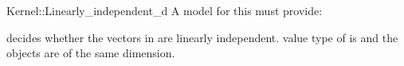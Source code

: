 \begin{ccRefFunctionObjectConcept}{Kernel::Linearly_independent_d}
A model for this must provide:


{decides whether the vectors in \ccc{A = tuple [first,last)} are linearly
 independent.  \ccPrecond value type of  is
  and the objects are of the same dimension.}

\end{ccRefFunctionObjectConcept}
